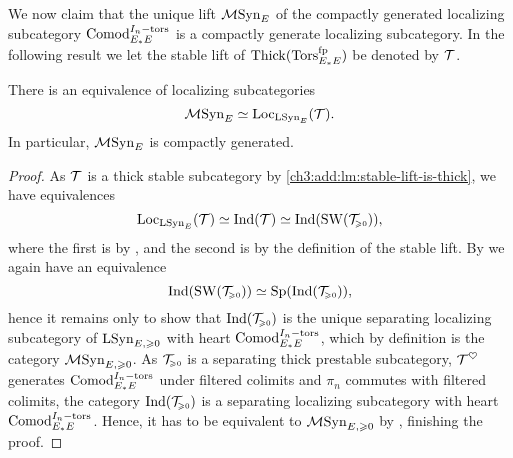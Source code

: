 We now claim that the unique lift $\MSynE$ of the compactly generated localizing subcategory $\Comodt$ is a compactly generate localizing subcategory. In the following result we let the stable lift of $\Thick(\TorsE)$ be denoted by $\T$. 

\begin{theorem}
    There is an equivalence of localizing subcategories 
    \[\MSynE \simeq \Loc_{\LSynE}(\T).\] 
    In particular, $\MSynE$ is compactly generated. 
\end{theorem}
\begin{proof}
    As $\T$ is a thick stable subcategory by \cref{ch3:add:lm:stable-lift-is-thick}, we have equivalences 
    \[\Loc_{\LSynE}(\T)\simeq \Ind(\T)\simeq \Ind(\SW(\T\geqz)),\]
    where the first is by \cite[2.15]{barthel-heard-valenzuela_2018}, and the second is by the definition of the stable lift. By \cite[C.1.1.6]{lurie_SAG} we again have an equivalence
    \[\Ind(\SW(\T\geqz)) \simeq \Sp(\Ind(\T\geqz)),\]
    hence it remains only to show that $\Ind(\T\geqz)$ is the unique separating localizing subcategory of $\LSyn_{E, \geq 0}$ with heart $\Comodt$, which by definition is the category $\MSyn_{E, \geq 0}$. As $\T\geqz$ is a separating thick prestable subcategory, $\T^\heart$ generates $\Comodt$ under filtered colimits and $\pi_n$ commutes with filtered colimits, the category $\Ind(\T\geqz)$ is a separating localizing subcategory with heart $\Comodt$. Hence, it has to be equivalent to $\MSyn_{E, \geq 0}$ by \cite[C.5.2.5, C.5.2.6]{lurie_SAG}, finishing the proof. 
\end{proof}


    


